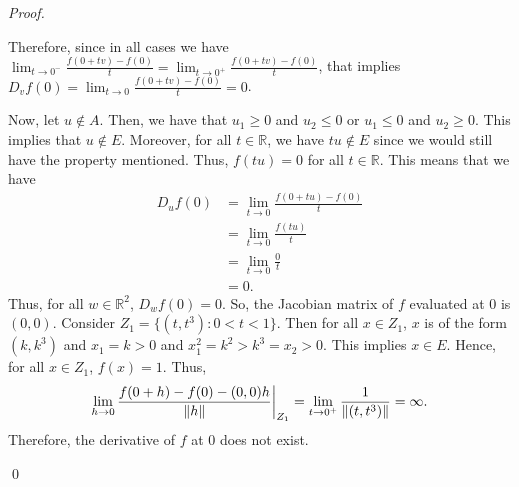 \documentclass[12pt]{article}
\newenvironment{sol}
    {\emph{Proof.}
    }
    {
    \qed
    }
\newcommand\restr[2]{{%
  \left.\kern-\nulldelimiterspace %
  #1 %
  \vphantom{\big|} %
  \right|_{#2} %
  }}
\begin{document}
\begin{sol}
  Therefore, since in all cases we have $\lim_{t \to 0^-} \frac{f(0 + tv) - f(0)}{t} = \lim_{t \to 0^+} \frac{f(0 + tv) - f(0)}{t}$, that implies $D_vf(0) = \lim_{t \to 0} \frac{f(0 + tv) - f(0)}{t} = 0$. 
  
  Now, let $u \not\in A$. Then, we have that $u_1 \geq 0$ and $u_2 \leq 0$ or $u_1 \leq 0$ and $u_2 \geq 0$. This implies that $u \not \in E$. Moreover, for all $t \in \mathbb{R}$, we have $tu \not\in E$ since we would still have the property mentioned. Thus, $f(tu) = 0$ for all $t \in \mathbb{R}$. This means that we have \begin{align*}
      D_uf(0) &= \lim_{t \to 0} \frac{f(0 + tu) - f(0)}{t} \\ &= \lim_{t \to 0} \frac{f(tu)}{t} \\ &= \lim_{t \to 0} \frac{0}{t} \\ &= 0.
  \end{align*}
  Thus, for all $w \in \mathbb{R}^2$, $D_wf(0) = 0$. So, the Jacobian matrix of $f$ evaluated at $0$ is $(0, 0)$. Consider $Z_1 = \{(t, t^3) : 0 < t < 1\}$. Then for all $x \in Z_1$, $x$ is of the form $(k, k^3)$ and $x_1 = k > 0$ and $x_1^2 = k^2 > k^3 = x_2 > 0$. This implies $x \in E$. Hence, for all $x \in Z_1$, $f(x) = 1$. Thus, $$\lim_{h \to 0} \restr{\frac{f(0 + h) - f(0) - (0, 0)h}{\lVert h \rVert}}{Z_1} = \lim_{t \to 0^+} \frac{1}{\lVert (t, t^3) \rVert} = \infty.$$ Therefore, the derivative of $f$ at $0$ does not exist.
  \end{sol}
\end{document}
